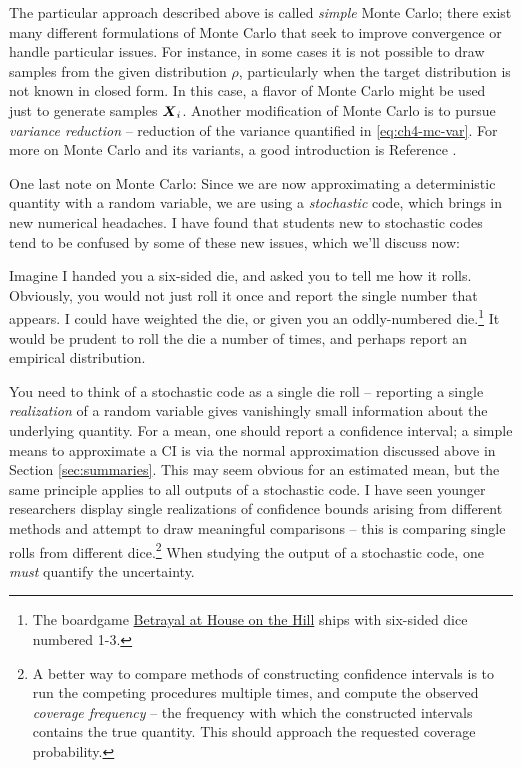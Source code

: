 \documentclass[../primer.tex]{subfiles}
\begin{document}
The particular approach described above is called \emph{simple} Monte Carlo;
there exist many different formulations of Monte Carlo that seek to improve
convergence or handle particular issues. For instance, in some cases it is not
possible to draw samples from the given distribution $\rho$, particularly when
the target distribution is not known in closed form. In this case, a flavor of
Monte Carlo might be used just to generate samples $\boldsymbol{X}_i$. Another modification
of Monte Carlo is to pursue \emph{variance reduction} -- reduction of the
variance quantified in \eqref{eq:ch4-mc-var}. For more on Monte Carlo and its
variants, a good introduction is Reference \cite{owen2013montecarlo}.

One last note on Monte Carlo: Since we are now approximating a deterministic
quantity with a random variable, we are using a \emph{stochastic} code, which
brings in new numerical headaches. I have found that students new to stochastic
codes tend to be confused by some of these new issues, which we'll discuss now:

Imagine I handed you a six-sided die, and asked you to tell me how it rolls.
Obviously, you would not just roll it once and report the single number that
appears. I could have weighted the die, or given you an oddly-numbered
die.\footnote{The boardgame
  \href{https://en.wikipedia.org/wiki/Betrayal_at_House_on_the_Hill}{Betrayal at
    House on the Hill} ships with six-sided dice numbered 1-3.} It would be
prudent to roll the die a number of times, and perhaps report an empirical
distribution.

You need to think of a stochastic code as a single die roll -- reporting a
single \emph{realization} of a random variable gives vanishingly small
information about the underlying quantity. For a mean, one should report a
confidence interval; a simple means to approximate a CI is via the normal
approximation discussed above in Section \ref{sec:summaries}. This may seem
obvious for an estimated mean, but the same principle applies to all outputs of
a stochastic code. I have seen younger researchers display single realizations
of confidence bounds arising from different methods and attempt to draw
meaningful comparisons -- this is comparing single rolls from different
dice.\footnote{A better way to compare methods of constructing confidence
  intervals is to run the competing procedures multiple times, and compute the
  observed \emph{coverage frequency} -- the frequency with which the constructed
  intervals contains the true quantity. This should approach the requested
  coverage probability.} When studying the output of a stochastic code, one
\emph{must} quantify the uncertainty.
\end{document}
